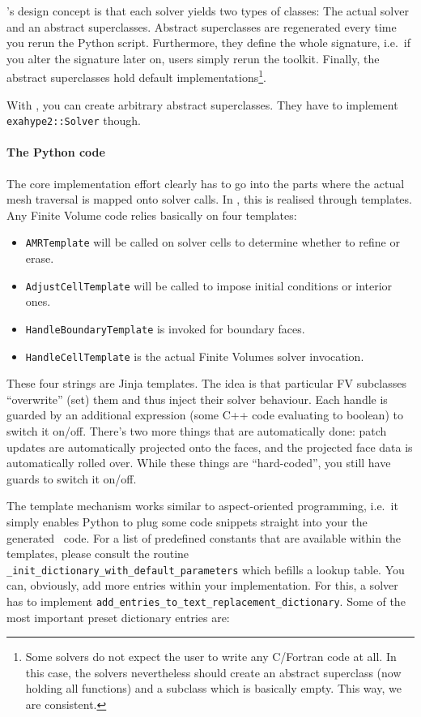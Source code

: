 \ExaHyPE's design concept is that each solver yields two types of classes:
The actual solver and an abstract superclasses. 
Abstract superclasses are regenerated every time you rerun the Python script.
Furthermore, they define the whole signature, i.e.~if you alter the signature
later on, users simply rerun the toolkit. 
Finally, the abstract superclasses hold default implementations\footnote{Some
solvers do not expect the user to write any C/Fortran code at all. In this
case, the solvers nevertheless should create an abstract superclass (now
holding all functions) and a subclass which is basically empty. This way, we
are consistent.}.


With \Peano, you can create arbitrary abstract superclasses. 
They have to implement \texttt{exahype2::Solver} though.


\paragraph{The Python code}


The core implementation effort clearly has to go into the parts where the actual
mesh traversal is mapped onto solver calls.
In \ExaHyPE, this is realised through templates. 
Any Finite Volume code relies basically on four templates:

\begin{itemize}
  \item \texttt{AMRTemplate} will be called on solver cells to determine whether
  to refine or erase.
  \item \texttt{AdjustCellTemplate} will be called to impose initial conditions
  or interior ones.
  \item \texttt{HandleBoundaryTemplate} is invoked for boundary faces.
  \item \texttt{HandleCellTemplate} is the actual Finite Volumes solver
  invocation.
\end{itemize}


\noindent
These four strings are Jinja templates. The idea is that particular FV
subclasses ``overwrite'' (set) them and thus inject their solver behaviour.
Each handle is guarded by an additional expression (some C++ code evaluating to
boolean) to switch it on/off.
There's two more things that are automatically done: patch updates are
automatically projected onto the faces, and the projected face data is
automatically rolled over.
While these things are ``hard-coded'', you still have guards to switch it
on/off.


The template mechanism works similar to aspect-oriented programming, i.e.~it
simply enables Python to plug some code snippets straight into your the
generated \ExaHyPE\ code. 
For a list of predefined constants that are available within the templates,
please consult the routine
\texttt{\_init\_dictionary\_with\_default\_parameters} which befills a lookup
table.
You can, obviously, add more entries within your implementation.
For this, a solver has to implement
\texttt{add\_entries\_to\_text\_replacement\_dictionary}.
Some of the most important preset dictionary entries are:


